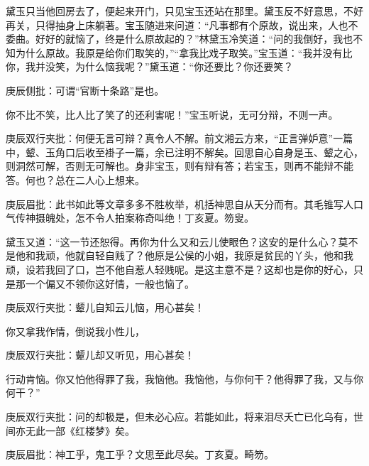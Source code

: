 \begin{parag}


    黛玉只当他回房去了，便起来开门，只见宝玉还站在那里。黛玉反不好意思，不好再关，只得抽身上床躺著。宝玉随进来问道：“凡事都有个原故，说出来，人也不委曲。好好的就恼了，终是什么原故起的？”林黛玉冷笑道：“问的我倒好，我也不知为什么原故。我原是给你们取笑的，”“拿我比戏子取笑。”宝玉道：“我并没有比你，我并没笑，为什么恼我呢？”黛玉道：“你还要比？你还要笑？\begin{note}庚辰侧批：可谓“官断十条路”是也。\end{note}你不比不笑，比人比了笑了的还利害呢！”宝玉听说，无可分辩，不则一声。\begin{note}庚辰双行夹批：何便无言可辩？真令人不解。前文湘云方来，“正言弹妒意”一篇中，颦、玉角口后收至褂子一篇，余已注明不解矣。回思自心自身是玉、颦之心，则洞然可解，否则无可解也。身非宝玉，则有辩有答；若宝玉，则再不能辩不能答。何也？总在二人心上想来。\end{note}\begin{note}庚辰眉批：此书如此等文章多多不胜枚举，机括神思自从天分而有。其毛锥写人口气传神摄魄处，怎不令人拍案称奇叫绝！丁亥夏。笏叟。\end{note}
\end{parag}


\begin{parag}


    黛玉又道：“这一节还恕得。再你为什么又和云儿使眼色？这安的是什么心？莫不是他和我顽，他就自轻自贱了？他原是公侯的小姐，我原是贫民的丫头，他和我顽，设若我回了口，岂不他自惹人轻贱呢。是这主意不是？这却也是你的好心，只是那一个偏又不领你这好情，一般也恼了。\begin{note}庚辰双行夹批：颦儿自知云儿恼，用心甚矣！\end{note}你又拿我作情，倒说我小性儿，\begin{note}庚辰双行夹批：颦儿却又听见，用心甚矣！\end{note}行动肯恼。你又怕他得罪了我，我恼他。我恼他，与你何干？他得罪了我，又与你何干？”\begin{note}庚辰双行夹批：问的却极是，但未必心应。若能如此，将来泪尽夭亡已化乌有，世间亦无此一部《红楼梦》矣。\end{note}\begin{note}庚辰眉批：神工乎，鬼工乎？文思至此尽矣。丁亥夏。畸笏。\end{note}
\end{parag}


